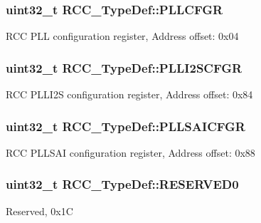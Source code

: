 \subsubsection[{\texorpdfstring{P\+L\+L\+C\+F\+GR}{PLLCFGR}}]{ uint32\+\_\+t R\+C\+C\+\_\+\+Type\+Def\+::\+P\+L\+L\+C\+F\+GR}\hypertarget{struct_r_c_c___type_def_a2a7ccb4e23cb05a574f243f6278b7b26}{}\label{struct_r_c_c___type_def_a2a7ccb4e23cb05a574f243f6278b7b26}
R\+CC P\+LL configuration register, Address offset\+: 0x04 
\subsubsection[{\texorpdfstring{P\+L\+L\+I2\+S\+C\+F\+GR}{PLLI2SCFGR}}]{ uint32\+\_\+t R\+C\+C\+\_\+\+Type\+Def\+::\+P\+L\+L\+I2\+S\+C\+F\+GR}\hypertarget{struct_r_c_c___type_def_ac3beb02dccd9131d6ce55bb29c5fa69f}{}\label{struct_r_c_c___type_def_ac3beb02dccd9131d6ce55bb29c5fa69f}
R\+CC P\+L\+L\+I2S configuration register, Address offset\+: 0x84 
\subsubsection[{\texorpdfstring{P\+L\+L\+S\+A\+I\+C\+F\+GR}{PLLSAICFGR}}]{ uint32\+\_\+t R\+C\+C\+\_\+\+Type\+Def\+::\+P\+L\+L\+S\+A\+I\+C\+F\+GR}\hypertarget{struct_r_c_c___type_def_ac4b6f819b8e4f7981b998bd75dafcbce}{}\label{struct_r_c_c___type_def_ac4b6f819b8e4f7981b998bd75dafcbce}
R\+CC P\+L\+L\+S\+AI configuration register, Address offset\+: 0x88 
\subsubsection[{\texorpdfstring{R\+E\+S\+E\+R\+V\+E\+D0}{RESERVED0}}]{\setlength{\rightskip}{0pt plus 5cm}uint32\+\_\+t R\+C\+C\+\_\+\+Type\+Def\+::\+R\+E\+S\+E\+R\+V\+E\+D0}\hypertarget{struct_r_c_c___type_def_a646631532167f3386763a2d10a881a04}{}\label{struct_r_c_c___type_def_a646631532167f3386763a2d10a881a04}
Reserved, 0x1C 
